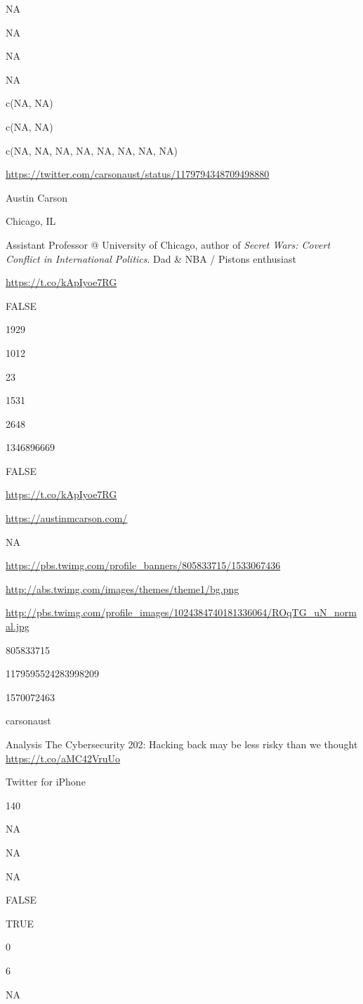 \documentclass[]{book}
\begin{document}
NA

NA

NA

NA

c(NA, NA)

c(NA, NA)

c(NA, NA, NA, NA, NA, NA, NA, NA)

\url{https://twitter.com/carsonaust/status/1179794348709498880}

Austin Carson

Chicago, IL

Assistant Professor @ University of Chicago, author of \emph{Secret
Wars: Covert Conflict in International Politics}. Dad \& NBA / Pistons
enthusiast

\url{https://t.co/kApIyoe7RG}

FALSE

1929

1012

23

1531

2648

1346896669

FALSE

\url{https://t.co/kApIyoe7RG}

\url{https://austinmcarson.com/}

NA

\url{https://pbs.twimg.com/profile_banners/805833715/1533067436}

\url{http://abs.twimg.com/images/themes/theme1/bg.png}

\url{http://pbs.twimg.com/profile_images/1024384740181336064/ROqTG_uN_normal.jpg}

805833715

1179595524283998209

1570072463

carsonaust

Analysis \textbar{} The Cybersecurity 202: Hacking back may be less
risky than we thought \citep[ft work by myself,][and
\citet{drbvaler}]{JackieGSchneid} \url{https://t.co/aMC42VruUo}

Twitter for iPhone

140

NA

NA

NA

FALSE

TRUE

0

6

NA
\end{document}
